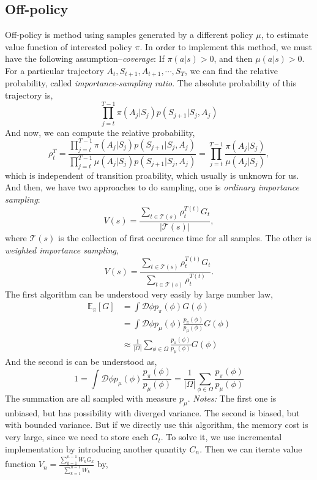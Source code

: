 \documentclass[11pt,a4paper]{article}
\def\D{{\mathcal D}}
\def\D{{\mathcal D}}
\def\T{{\mathcal T}}
\def\E{\mathbb{E}}
\begin{document}
\subsection{Off-policy}
Off-policy is method using samples generated by a different policy $\mu$, to estimate value function of interested policy $\pi$. In order to implement this method, we must have the following assumption--\emph{coverage}: If $\pi(a|s)>0$, and then $\mu(a|s)>0$. For a particular trajectory $A_t,S_{t+1},A_{t+1},\cdots,S_T$, we can find the relative probability, called \emph{importance-sampling ratio}. The absolute probability of this trajectory is,
$$
\prod_{j=t}^{T-1}\pi(A_{j}|S_j)p(S_{j+1}|S_j,A_j)
$$
And now, we can compute the relative probability,
\begin{equation}
\rho_{t}^T = \frac{\prod_{j=t}^{T-1}\pi(A_{j}|S_j)p(S_{j+1}|S_j,A_j)}{\prod_{j=t}^{T-1}\mu(A_{j}|S_j)p(S_{j+1}|S_j,A_j)} = \prod_{j=t}^{T-1}\frac{\pi(A_j|S_j)}{\mu(A_j|S_j)},
\end{equation}
which is independent of transition proability, which usually is unknown for us.
And then, we have two approaches to do sampling, one is \emph{ordinary importance sampling}:
\begin{equation}
V(s) = \frac{\sum_{t \in \T(s)}\rho_{t}^{T(t)}G_t}{|\T(s)|},
\end{equation}
where $\T(s)$ is the collection of first occurence time for all samples. The other is \emph{weighted importance sampling},
\begin{equation}
V(s) = \frac{\sum_{t \in \T(s)}\rho_{t}^{T(t)}G_t}{\sum_{t\in \T(s)}\rho_t^{T(t)}}.
\end{equation}
The first algorithm can be understood very easily by large number law,
\begin{align}
\E_{\pi}[G] & = \int \D\phi p_{\pi}(\phi)G(\phi) \\ 
& = \int \D \phi p_{\mu}(\phi)\frac{p_{\pi}(\phi)}{p_{\mu}(\phi)}G(\phi) \\ 
& \approx \frac{1}{|\Omega|}\sum_{\phi \in \Omega}\frac{p_{\pi}(\phi)}{p_{\mu}(\phi)}G(\phi)
\end{align}
And the second is can be understood as,
\begin{equation}
1 = \int \D\phi p_{\mu}(\phi)\frac{p_{\pi}(\phi)}{p_{\mu}(\phi)} = \frac{1}{|\Omega|}\sum_{\phi\in \Omega}\frac{p_{\pi}(\phi)}{p_{\mu}(\phi)}
\end{equation}
The summation are all sampled with measure $p_{\mu}$.
\emph{Notes:} The first one is unbiased, but has possibility with diverged variance. The second is biased, but with bounded variance. But if we directly use this algorithm, the memory cost is very large, since we need to store each $G_t$. To solve it, we use incremental implementation by introducing another quantity $C_n$. Then we can iterate value function $V_n= \frac{\sum_{k=1}^{n-1}W_kG_k}{\sum_{k=1}^{n-1}W_k}$ by,
\end{document}
